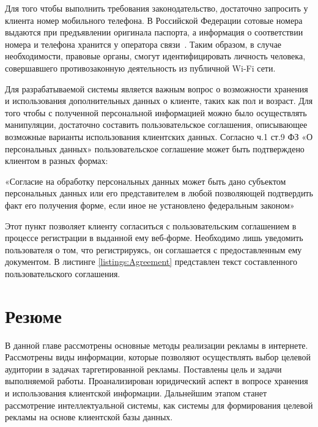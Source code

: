 Для того чтобы выполнить требования законодательство, достаточно запросить у клиента номер мобильного телефона. В Российской Федерации сотовые номера выдаются при предъявлении оригинала паспорта, а информация о соответствии номера и телефона хранится у оператора связи~\cite{fz}. Таким образом, в случае необходимости, правовые органы, смогут идентифицировать личность человека, совершавшего противозаконную деятельность из публичной Wi-Fi сети.

Для разрабатываемой системы является важным вопрос о возможности хранения и использования дополнительных данных о клиенте, таких как пол и возраст. Для того чтобы с полученной персональной информацией можно было осуществлять манипуляции, достаточно составить пользовательское соглашения, описывающее возможные варианты использования клиентских данных. Согласно ч.1 ст.9 ФЗ «О персональных данных» пользовательское соглашение может быть подтверждено клиентом в разных формах:

«Согласие на обработку персональных данных может быть дано субъектом персональных данных или его представителем в любой позволяющей подтвердить факт его получения форме, если иное не установлено федеральным законом»

Этот пункт позволяет клиенту согласиться с пользовательским соглашением в процессе регистрации в выданной ему веб-форме. Необходимо лишь уведомить пользователя о том, что регистрируясь, он соглашается с предоставленным ему документом. В листинге \ref{listings:Agreement} представлен текст составленного пользовательского соглашения.

\section{Резюме}

В данной главе рассмотрены основные методы реализации рекламы в интернете. Рассмотрены виды информации, которые позволяют осуществлять выбор целевой аудитории в задачах таргетированной рекламы. Поставлены цель и задачи выполняемой работы. Проанализирован юридический аспект в вопросе хранения и использования клиентской информации. Дальнейшим этапом станет рассмотрение интеллектуальной системы, как системы для формирования целевой рекламы на основе клиентской базы данных.